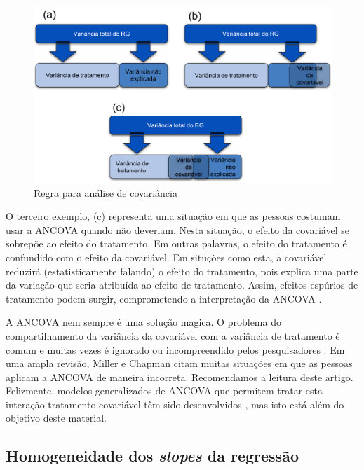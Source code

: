 \documentclass[
]{book}
\begin{document}
\begin{figure}
\centering
\includegraphics{figures/covariavel.png}
\caption{Regra para análise de covariância}
\end{figure}

O terceiro exemplo, (c) representa uma situação em que as pessoas costumam usar a ANCOVA quando não deveriam. Nesta situação, o efeito da covariável se sobrepõe ao efeito do tratamento. Em outras palavras, o efeito do tratamento é confundido com o efeito da covariável. Em situções como esta, a covariável reduzirá (estatisticamente falando) o efeito do tratamento, pois explica uma parte da variação que seria atribuída ao efeito de tratamento. Assim, efeitos espúrios de tratamento podem surgir, comprometendo a interpretação da ANCOVA \citep{Stevens2009}.

A ANCOVA nem sempre é uma solução magica. O problema do compartilhamento da variância da covariável com a variância de tratamento é comum e muitas vezes é ignorado ou incompreendido pelos pesquisadores \citep{Miller2001}. Em uma ampla revisão, Miller e Chapman citam muitas situações em que as pessoas aplicam a ANCOVA de maneira incorreta. Recomendamos a leitura deste artigo. Felizmente, modelos generalizados de ANCOVA que permitem tratar esta interação tratamento-covariável têm sido desenvolvidos \citep{Mayer2014}, mas isto está além do objetivo deste material.

\hypertarget{homogeneidade-dos-slopes-da-regressuxe3o}{%
\subsection{\texorpdfstring{Homogeneidade dos \emph{slopes} da regressão}{Homogeneidade dos slopes da regressão}}\label{homogeneidade-dos-slopes-da-regressuxe3o}}
\end{document}
